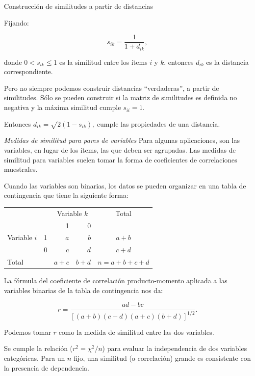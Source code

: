 \documentclass[spanish]{beamer}
\begin{document}
\begin{frame}{Construcción de similitudes a partir de distancias}

Fijando:

$$ s_{ik} = \frac{1}{1+d_{ik}},$$ 

donde $0<s_{ik}\leq 1$ es la similitud entre los ítems $i$ y $k$, entonces $d_{ik}$ es la distancia correspondiente.\break

Pero no siempre podemos construir distancias ``verdaderas'', a partir de similitudes. Sólo se pueden construir si la matriz de similitudes es definida no negativa y la máxima similitud cumple $s_{ii}=1$.\break

Entonces $ d_{ik}=\sqrt{2(1-s_{ik})}$, cumple las propiedades de una distancia.
\end{frame}

\begin{frame}{\textit{Medidas de similitud para pares de variables}}
Para algunas aplicaciones, son las variables, en lugar de los ítems, las que deben ser agrupadas. Las medidas de similitud para variables suelen tomar la forma de coeficientes de correlaciones muestrales.\break

Cuando las variables son binarias, los datos se pueden organizar en una tabla de contingencia que tiene la siguiente forma:

\begin{table}[h]
  \centering
\resizebox{7.5cm}{!} {
\begin{tabular}{llrrrr}
\multicolumn{2}{l}{\multirow{}{}{}} & \multicolumn{2}{c}{Variable $k$} & \multicolumn{2}{c}{\multirow{}{}{Total}} \\\cmidrule{3-4}
\multicolumn{2}{l}{}                  & 1             & 0       & \multicolumn{2}{c}{}                        \\ \hline
\multirow{}{}{Variable $i$}       & 1      & $a$          & $b$       & \multicolumn{2}{c}{$a+b$}                     \\
                              & 0      & c            & $d$       & \multicolumn{2}{c}{$c+d$}                     \\ \hline
\multicolumn{2}{l}{Total}            & $a+c$          & $b+d$     & \multicolumn{2}{c}{$n=a+b+c+d$}\\
\bottomrule            
\end{tabular}
}
\end{table}
\end{frame}

\begin{frame}{}
La fórmula del coeficiente de correlación producto-momento aplicada a las variables binarias de la tabla de contingencia nos da:

$$r = \frac{ad-bc}{[(a+b)(c+d)(a+c)(b+d)]^{1/2}}.$$

Podemos tomar $r$ como la medida de similitud entre las dos variables.\break

Se cumple la relación ($r^2=\chi^2/n$) para evaluar la independencia de dos variables categóricas. Para un $n$ fijo, una similitud (o correlación) grande es consistente con la presencia de dependencia.
\end{frame}
\end{document}
